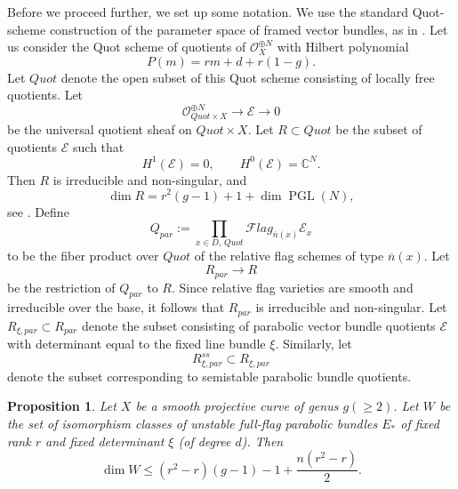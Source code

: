 \documentclass[11pt, reqno]{amsart}
\numberwithin{equation}{section}
\newtheorem{prop}[theorem]{Proposition}
\DeclareMathOperator{\PGL}{PGL}
\theoremstyle{definition}
\begin{document}
Before we proceed further, we set up some notation. We use the standard Quot-scheme construction of the parameter space of framed vector bundles, as in \cite{S00,BB23}. Let us consider the Quot scheme of quotients of $\mathcal{O}_X^{\oplus N}$ with Hilbert polynomial
\[
P(m)=rm+d+r(1-g).
\]
Let $Quot$ denote the open subset of this Quot scheme consisting of locally free quotients. Let
\[
\mathcal{O}^{\oplus N}_{Quot \times X} \longrightarrow \mathcal{E} \longrightarrow 0
\]
be the universal quotient sheaf on $Quot \times X$. Let $R \subset Quot$ be the subset of quotients $\mathcal{E}$ such that
\[
H^1(\mathcal{E})=0,\qquad H^0(\mathcal{E})=\mathbb{C}^N.
\]
Then $R$ is irreducible and non-singular, and
\[
\dim R= r^2(g-1)+1+\dim \PGL(N),
\]
see \cite{S00,BB23}. Define
\[
Q_{par}:= \prod_{x\in D,\,Quot} \mathcal{F}lag_{\overline{n}(x)}\mathcal{E}_x
\]
to be the fiber product over $Quot$ of the relative flag schemes of type $\overline{n}(x)$. Let
\[
R_{par}\longrightarrow R
\]
be the restriction of $Q_{par}$ to $R$. Since relative flag varieties are smooth and irreducible over the base, it follows that $R_{par}$ is irreducible and non-singular. Let $R_{\xi,par}\subset R_{par}$ denote the subset consisting of parabolic vector bundle quotients $\mathcal{E}$ with determinant equal to the fixed line bundle $\xi$. Similarly, let
\[
R^{ss}_{\xi,par}\subset R_{\xi,par}
\]
denote the subset corresponding to semistable parabolic bundle quotients.



\begin{prop}\label{key_dim}
Let \(X\) be a smooth projective curve of genus \(g (\geq 2)\).
Let $W$ be the set of isomorphism classes of unstable full-flag parabolic bundles $E_{*}$ of fixed rank $r$ and fixed determinant $\xi$ (of degree $d$).
Then
\[
\dim W \le (r^2-r)(g-1)-1+\frac{n(r^2-r)}{2}.
\]
\end{prop}
\end{document}
